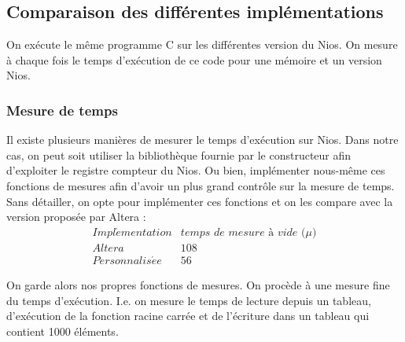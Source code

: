 \documentclass[12pt,a4paper]{article}
\begin{document}

\subsection{Comparaison des différentes implémentations}
On exécute le même programme C sur les différentes version du Nios. On mesure à chaque fois le temps d'exécution de ce code pour une mémoire et un version Nios.

\subsubsection{Mesure de temps}
Il existe plusieurs manières de mesurer le temps d'exécution sur Nios. Dans notre cas, on peut soit utiliser la bibliothèque fournie par le constructeur afin d'exploiter le registre compteur du Nios. Ou bien, implémenter nous-même ces fonctions de mesures afin d'avoir un plus grand contrôle sur la mesure de temps. Sans détailler, on opte pour implémenter ces fonctions et on les compare avec la version proposée par Altera :
$$
\begin{array}{cc}
	Impl\acute{e}mentation & \textit{temps de mesure à  vide ($\mu$)} \\ 
	Altera & 108 \\ 
	Personnalis\acute{e}e & 56 
\end{array} 
$$

On garde alors nos propres fonctions de mesures. On procède à une mesure fine du temps d'exécution. I.e. on  mesure le temps de lecture depuis un tableau, d'exécution de la fonction racine carrée et de l'écriture dans un tableau qui contient 1000 éléments.
\end{document}
